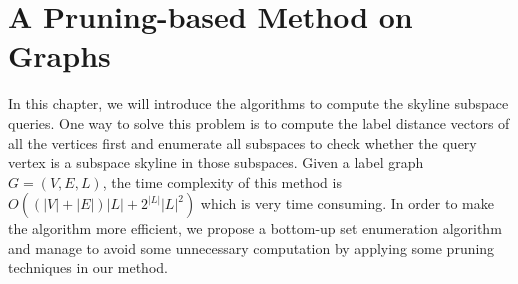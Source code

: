 
%
%

\chapter{A Pruning-based Method on Graphs}
\label{ch:graph}

In this chapter, we will introduce the algorithms to compute the skyline subspace queries. One way to solve this problem is to compute the label distance vectors of all the vertices first and enumerate all subspaces to check whether the query vertex is a subspace skyline in those subspaces. Given a label graph $G=(V, E, L)$, the time complexity of this method is $O((|V|+|E|)|L| + 2^{|L|}|L|^2)$ which is very time consuming. In order to make the algorithm more efficient, we propose a bottom-up set enumeration algorithm and manage to avoid some unnecessary computation by applying some pruning techniques in our method.

